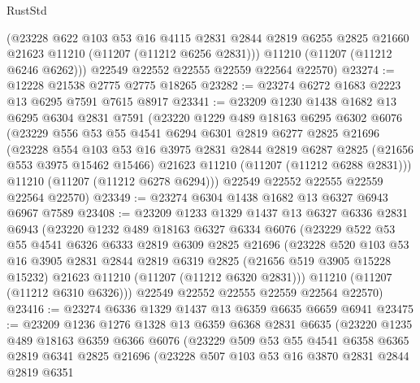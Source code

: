 \begin{lexlean}{RustStd}
\begin{coremodule}
        (@23228
          @622
          @103
          @53
          @16
          @4115
          @2831
          @2844
          @2819
          @6255
          @2825
          @21660
          @21623
          @11210
          (@11207 (@11212 @6256 @2831)))
        @11210
        (@11207 (@11212 @6246 @6262)))
      @22549
      @22552
      @22555
      @22559
      @22564
      @22570)
@23274 := @12228 @21538 @2775 @2775 @18265
@23282 := @23274 @6272 @1683 @2223 @13 @6295 @7591 @7615 @8917
@23341 := @23209
    @1230
    @1438
    @1682
    @13
    @6295
    @6304
    @2831
    @7591
    (@23220
      @1229
      @489
      @18163
      @6295
      @6302
      @6076
      (@23229
        @556
        @53
        @55
        @4541
        @6294
        @6301
        @2819
        @6277
        @2825
        @21696
        (@23228
          @554
          @103
          @53
          @16
          @3975
          @2831
          @2844
          @2819
          @6287
          @2825
          (@21656 @553 @3975 @15462 @15466)
          @21623
          @11210
          (@11207 (@11212 @6288 @2831)))
        @11210
        (@11207 (@11212 @6278 @6294)))
      @22549
      @22552
      @22555
      @22559
      @22564
      @22570)
@23349 := @23274 @6304 @1438 @1682 @13 @6327 @6943 @6967 @7589
@23408 := @23209
    @1233
    @1329
    @1437
    @13
    @6327
    @6336
    @2831
    @6943
    (@23220
      @1232
      @489
      @18163
      @6327
      @6334
      @6076
      (@23229
        @522
        @53
        @55
        @4541
        @6326
        @6333
        @2819
        @6309
        @2825
        @21696
        (@23228
          @520
          @103
          @53
          @16
          @3905
          @2831
          @2844
          @2819
          @6319
          @2825
          (@21656 @519 @3905 @15228 @15232)
          @21623
          @11210
          (@11207 (@11212 @6320 @2831)))
        @11210
        (@11207 (@11212 @6310 @6326)))
      @22549
      @22552
      @22555
      @22559
      @22564
      @22570)
@23416 := @23274 @6336 @1329 @1437 @13 @6359 @6635 @6659 @6941
@23475 := @23209
    @1236
    @1276
    @1328
    @13
    @6359
    @6368
    @2831
    @6635
    (@23220
      @1235
      @489
      @18163
      @6359
      @6366
      @6076
      (@23229
        @509
        @53
        @55
        @4541
        @6358
        @6365
        @2819
        @6341
        @2825
        @21696
        (@23228
          @507
          @103
          @53
          @16
          @3870
          @2831
          @2844
          @2819
          @6351

\end{coremodule}
\end{lexlean}
